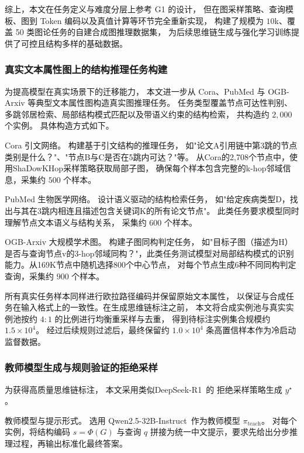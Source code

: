 综上，本文在任务定义与难度分层上参考 G1\cite{Guo2025G1TL} 的设计，
但在图采样策略、查询模板、图到 Token 编码以及真值计算等环节完全重新实现，
构建了规模为 \(10\)k、覆盖 50 类图论任务的自建合成图推理数据集，
为后续思维链生成与强化学习训练提供了可控且结构多样的基础数据。

\subsubsection{真实文本属性图上的结构推理任务构建}
\label{subsubsec:real_tasks}

为提高模型在真实场景下的迁移能力，
本文进一步从 Cora、PubMed 与 OGB-Arxiv 等典型文本属性图构造真实图推理任务。
任务类型覆盖节点可达性判别、多跳邻居检索、局部结构模式匹配以及带语义约束的结构检索，
共构造约 $2{,}000$ 个实例。
具体构造方式如下。

{Cora 引文网络。}
构建基于引文结构的推理任务，
如"论文A引用链中第3跳的节点类别是什么？"、"节点B与C是否在5跳内可达？"等。
从Cora的2,708个节点中，使用ShaDowKHop采样策略获取局部子图，
确保每个样本包含完整的k-hop邻域信息，采集约 $500$ 个样本。

{PubMed 生物医学网络。}
设计语义驱动的结构检索任务，
如"给定疾病类型D，找出与其在3跳内相连且描述包含关键词K的所有论文节点"。
此类任务要求模型同时理解节点文本语义与结构关系，
采集约 $600$ 个样本。

{OGB-Arxiv 大规模学术图。}
构建子图同构判定任务，
如"目标子图（描述为H）是否与查询节点v的3-hop邻域同构？"，此类任务测试模型对局部结构模式的识别能力。从169K节点中随机选择800个中心节点，
对每个节点生成6种不同同构判定查询，采集约 $900$ 个样本。

所有真实任务样本同样进行欧拉路径编码并保留原始文本属性，
以保证与合成任务在输入格式上的一致性。在生成思维链标注之前，
本文将合成实例池与真实实例池按约 $4:1$ 的比例进行均衡重采样与去重，
得到待标注实例集合规模约 $1.5\times 10^4$。
经过后续规则过滤后，最终保留约 $1.0\times 10^4$ 条高置信样本作为冷启动监督数据。

\subsubsection{教师模型生成与规则验证的拒绝采样}
\label{subsubsec:rejection_cot}

为获得高质量思维链标注，
本文采用类似DeepSeek-R1\cite{DeepSeekAI2025DeepSeekR1IR}\ 的
拒绝采样策略生成 $y^\star$。

{教师模型与提示形式。}
选用 Qwen2.5-32B-Instruct\cite{Yang2024Qwen25TR}\ 作为教师模型 $\pi_{\text{teach}}$。
对每个实例，将结构编码 $s=\Phi(G)$ 与查询 $q$ 拼接为统一中文提示，要求先给出分步推理过程，再输出标准化最终答案。

